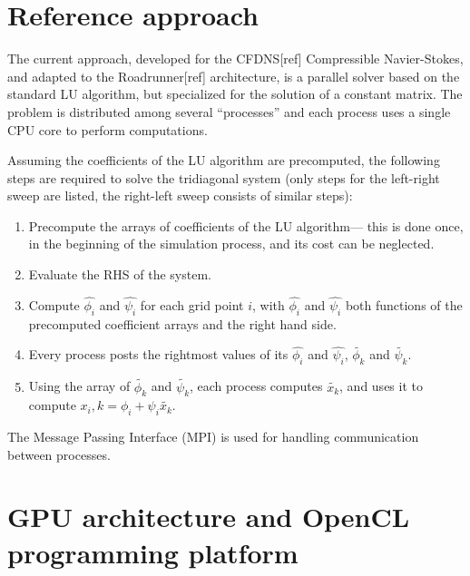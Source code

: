 \documentclass{article}
\begin{document}
\section{Reference approach}
    The current approach, developed for the CFDNS[ref] Compressible Navier-Stokes,
    and adapted to the Roadrunner[ref] architecture,
    is a parallel solver based on the standard LU algorithm,
    but specialized for the solution of a constant matrix.
    The problem is distributed among several ``processes'' and each
    process uses a single CPU core to perform computations.

    Assuming the coefficients of the LU algorithm are precomputed,
    the following steps are required to solve the tridiagonal system
    (only steps for the left-right sweep are listed, the right-left sweep
    consists of similar steps):

    \begin{enumerate}
    \item Precompute the arrays of coefficients of the LU algorithm---
    this is done once, in the beginning of the simulation process, and its cost
    can be neglected.
    \item Evaluate the RHS of the system.
    \item Compute $\hat{\phi_i}$ and $\hat{\psi_i}$ for each grid point $i$,
    with $\hat{\phi_i}$ and $\hat{\psi_i}$ both functions of the precomputed
    coefficient arrays and the right hand side.
    \item Every process posts the rightmost values of its $\hat{\phi_i}$ and $\hat{\psi_i}$,
        $\widetilde{\phi_k}$ and $\widetilde{\psi_k}$.
    \item Using the array of $\widetilde{\phi_k}$ and $\widetilde{\psi_k}$,
        each process computes $\widetilde{x_k}$, and uses it to compute
        $x_i,k = \phi_i + \psi_i\widetilde{x_k}$.
    \end{enumerate}

    The Message Passing Interface (MPI) is used for handling communication
    between processes.

\section{GPU architecture and OpenCL programming platform}
\end{document}
